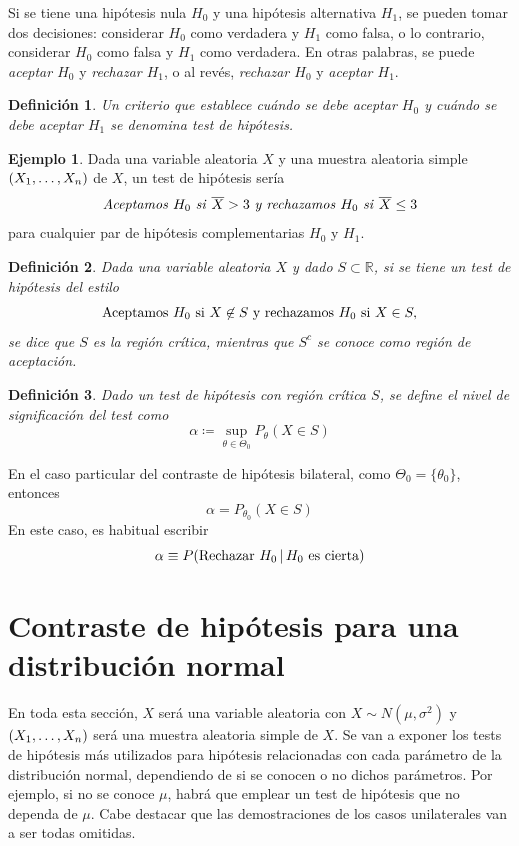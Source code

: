 \documentclass[11pt]{report}
\newtheorem{definition}{Definición}
\theoremstyle{definition}
\newtheorem{example}{Ejemplo}
\newcommand{\R}{\mathbb R}
\begin{document}
Si se tiene una hipótesis nula $H_0$ y una hipótesis alternativa $H_1$, se pueden tomar dos decisiones: considerar $H_0$ como verdadera y $H_1$ como falsa, o lo contrario, considerar $H_0$ como falsa y $H_1$ como verdadera. En otras palabras, se puede \emph{aceptar $H_0$} y \emph{rechazar $H_1$}, o al revés, \emph{rechazar $H_0$} y \emph{aceptar $H_1$}.

\begin{definition}
    Un criterio que establece cuándo se debe aceptar $H_0$ y cuándo se debe aceptar $H_1$ se denomina \emph{test de hipótesis}. 
\end{definition}

\begin{example}
    Dada una variable aleatoria $X$ y una muestra aleatoria simple $(X_1,\mathellipsis,X_n)$ de $X$, un test de hipótesis sería
    \[\textup{\emph{Aceptamos} } H_0 \textup{ \emph{si} } \overline{X} >3 \textup{ \emph{y rechazamos} } H_0 \textup{ \emph{si} } \overline{X} \leq 3\]
    para cualquier par de hipótesis complementarias $H_0$ y $H_1$.
\end{example}

\begin{definition}
    Dada una variable aleatoria $X$ y dado $S \subset \R$, si se tiene un test de hipótesis del estilo
    \[\textup{Aceptamos } H_0 \textup{ si } X \not\in S \textup{ y rechazamos } H_0 \textup{ 
        {si} } X \in S,\]
    se dice que $S$ es la \emph{región crítica}, mientras que $S^c$ se conoce como \emph{región de aceptación}.
\end{definition}

\begin{definition}
    Dado un test de hipótesis con región crítica $S$, se define el \emph{nivel de significación del test} como
    \[\alpha \coloneqq \sup_{\theta \in \Theta_0} P_\theta(X \in S)\]
\end{definition}

En el caso particular del contraste de hipótesis bilateral, como $\Theta_0 = \{\theta_0\}$, entonces
\[\alpha = P_{\theta_0} (X \in S)\]
En este caso, es habitual escribir
\[\alpha \equiv P(\textup{Rechazar } H_0 \, | \, H_0 \textup{ es cierta})\]


\section{Contraste de hipótesis para una distribución normal}

En toda esta sección, $X$ será una variable aleatoria con $X \sim N(\mu,\sigma^2)$ y $(X_1,\mathellipsis,X_n)$ será una muestra aleatoria simple de $X$. Se van a exponer los tests de hipótesis más utilizados para hipótesis relacionadas con cada parámetro de la distribución normal, dependiendo de si se conocen o no dichos parámetros. Por ejemplo, si no se conoce $\mu$, habrá que emplear un test de hipótesis que no dependa de $\mu$. Cabe destacar que las demostraciones de los casos unilaterales van a ser todas omitidas.
\end{document}
